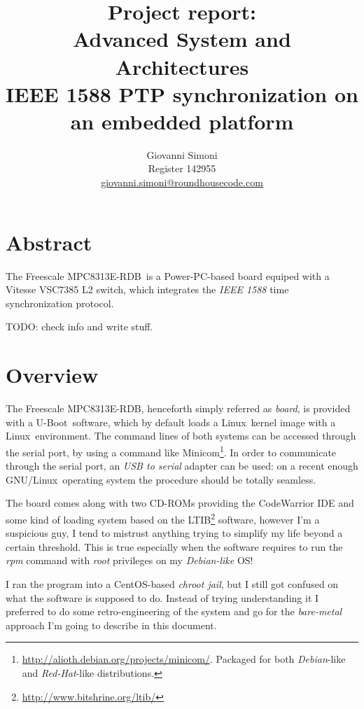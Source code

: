 \documentclass[10pt,a4paper]{article}
\title {
    Project report:\\
    Advanced System and Architectures\\
    IEEE 1588 PTP synchronization on an embedded platform
}
\author{
    Giovanni Simoni\\
    Register 142955\\
    \href{mailto:giovanni.simoni@roundhousecode.com}
         {giovanni.simoni@roundhousecode.com}
}
\newcommand{\TechName}[1]{\textsf{{#1}}}
\newcommand{\StdName}[1]{\emph{{#1}}}
\newcommand{\MyBoard}{\TechName{Freescale MPC8313E-RDB}}
\newcommand{\PPC}{\TechName{Power-PC}}
\newcommand{\uBoot}{\TechName{U-Boot}}
\newcommand{\Linux}{\TechName{Linux}}
\newcommand{\GNULinux}{\TechName{GNU}/\Linux}
\newcommand{\BusyBox}{\TechName{Linux}}
\newcommand{\Minicom}{\TechName{Minicom}}
\newcommand{\LTIB}{\TechName{LTIB}}
\begin{document}
\maketitle

    \section*{ \center Abstract }

        The \MyBoard\ is a \PPC-based board equiped with a
        \TechName{Vitesse VSC7385 L2 switch}, which integrates the
        \StdName{IEEE 1588} time synchronization protocol.

        TODO: check info and write stuff.

    \tableofcontents
    \newpage

    \section{ Overview }

        The \MyBoard, henceforth simply referred as \emph{board}, is
        provided with a \uBoot\ software, which by default loads a \Linux\
        kernel image with a \BusyBox\ environment. The command lines of
        both systems can be accessed through the serial port, by using a
        command like \Minicom\footnote{
            \url{http://alioth.debian.org/projects/minicom/}. Packaged for
        both \emph{Debian}-like and \emph{Red-Hat}-like distributions.
        }. In order to communicate through the serial port, an \emph{USB
        to serial} adapter can be used: on a recent enough \GNULinux\
        operating system the procedure should be totally seamless.

        The board comes along with two CD-ROMs providing the
        \TechName{CodeWarrior} IDE and some kind of loading system based
        on the \LTIB\footnote{ \url{http://www.bitshrine.org/ltib/} }
        software, however I'm a suspicious guy, I tend to mistrust
        anything trying to simplify my life beyond a certain threshold.
        This is true especially when the software requires to run the
        \emph{rpm} command with \emph{root} privileges on my
        \emph{Debian-like} OS!

        I ran the program into a \TechName{CentOS}-based \emph{chroot
        jail}, but I still got confused on what the software is supposed
        to do. Instead of trying understanding it I preferred to do
        some retro-engineering of the system and go for the
        \emph{bare-metal} approach I'm going to describe in this
        document.
\end{document}
